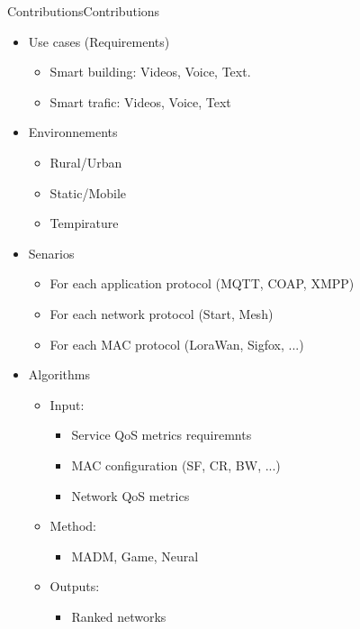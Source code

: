 \begin{frame}{Contributions}{Contributions}


\begin{itemize}
	\item Use cases (Requirements)
	\begin{itemize}
		\item Smart building: Videos, Voice, Text. 
		\item Smart trafic: Videos, Voice, Text
	\end{itemize}
\end{itemize}


\begin{itemize}
	\item Environnements
	\begin{itemize}
		\item Rural/Urban
		\item Static/Mobile
		\item Tempirature
	\end{itemize}
\end{itemize}

\begin{itemize}
	\item Senarios
	\begin{itemize}
		\item For each application protocol (MQTT, COAP, XMPP)
		\item For each network protocol (Start, Mesh)
		\item For each MAC protocol (LoraWan, Sigfox, ...)
	\end{itemize}
\end{itemize}

\begin{itemize}
	\item Algorithms
	\begin{itemize}
		\item Input:
		\begin{itemize}
			\item Service QoS metrics requiremnts
			\item MAC configuration (SF, CR, BW, ...)
			\item Network QoS metrics
		\end{itemize}


		\item Method:
		\begin{itemize}
			\item MADM, Game, Neural
		\end{itemize}

			\item Outputs:
		\begin{itemize}
			\item Ranked networks
		\end{itemize}
	\end{itemize}
\end{itemize}


\end{frame}





